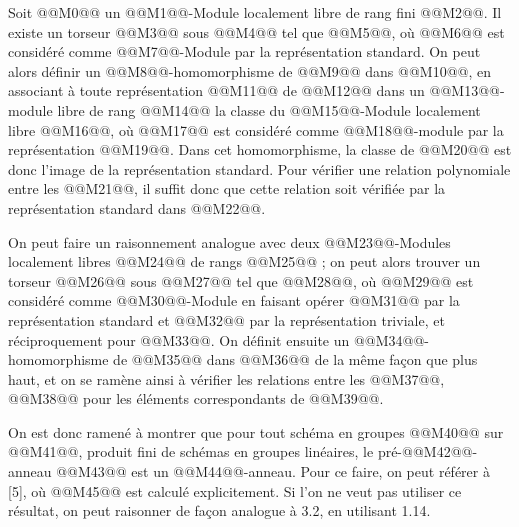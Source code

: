 
Soit @@M0@@ un @@M1@@-Module localement libre de rang fini @@M2@@. Il existe un torseur @@M3@@ sous @@M4@@ tel que @@M5@@, où @@M6@@ est considéré comme @@M7@@-Module par la représentation standard. On peut alors définir un @@M8@@-homomorphisme de @@M9@@ dans @@M10@@, en associant à toute représentation @@M11@@ de @@M12@@ dans un @@M13@@-module libre de rang @@M14@@ la classe du @@M15@@-Module localement libre
@@M16@@, où @@M17@@ est considéré comme @@M18@@-module par la représentation @@M19@@. Dans cet homomorphisme, la classe de @@M20@@ est donc l'image de la représentation standard. Pour vérifier une relation polynomiale entre les @@M21@@, il suffit donc que cette relation soit vérifiée par la représentation standard dans @@M22@@.

On peut faire un raisonnement analogue avec deux @@M23@@-Modules localement libres @@M24@@ de rangs @@M25@@ ; on peut alors trouver un torseur @@M26@@ sous @@M27@@ tel que @@M28@@, où @@M29@@ est considéré comme @@M30@@-Module en faisant opérer @@M31@@ par la représentation standard et @@M32@@ par la représentation triviale, et réciproquement pour @@M33@@. On définit ensuite un @@M34@@-homomorphisme de @@M35@@ dans @@M36@@ de la même façon que plus haut, et on se ramène ainsi à vérifier les relations entre les @@M37@@, @@M38@@ pour les éléments correspondants de @@M39@@.

On est donc ramené à montrer que pour tout schéma en groupes @@M40@@ sur @@M41@@, produit fini de schémas en groupes linéaires, le pré-@@M42@@-anneau @@M43@@ est un @@M44@@-anneau. Pour ce faire, on peut référer à [5], où @@M45@@ est calculé explicitement. Si l'on ne veut pas utiliser ce résultat, on peut raisonner de façon analogue à 3.2, en utilisant 1.14.

